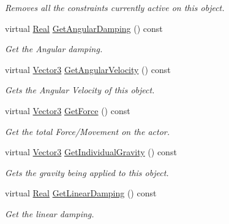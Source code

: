 \begin{DoxyCompactItemize}
\begin{DoxyCompactList}\small\item\em Removes all the constraints currently active on this object. \item\end{DoxyCompactList}\item 
virtual \hyperlink{namespaceMezzanine_a726731b1a7df72bf3583e4a97282c6f6}{Real} \hyperlink{classMezzanine_1_1ActorRigidPhysicsSettings_afadd3d7e1cee938622fc3781543489eb}{GetAngularDamping} () const 
\begin{DoxyCompactList}\small\item\em Get the Angular damping. \item\end{DoxyCompactList}\item 
virtual \hyperlink{classMezzanine_1_1Vector3}{Vector3} \hyperlink{classMezzanine_1_1ActorRigidPhysicsSettings_a5b078e767c73636afbabc0434f7af8c7}{GetAngularVelocity} () const 
\begin{DoxyCompactList}\small\item\em Gets the Angular Velocity of this object. \item\end{DoxyCompactList}\item 
virtual \hyperlink{classMezzanine_1_1Vector3}{Vector3} \hyperlink{classMezzanine_1_1ActorRigidPhysicsSettings_af5b4641d041c0dcbba8ef0a28566ca87}{GetForce} () const 
\begin{DoxyCompactList}\small\item\em Get the total Force/Movement on the actor. \item\end{DoxyCompactList}\item 
virtual \hyperlink{classMezzanine_1_1Vector3}{Vector3} \hyperlink{classMezzanine_1_1ActorRigidPhysicsSettings_aec9ec4d94326545b60056043c65bdb49}{GetIndividualGravity} () const 
\begin{DoxyCompactList}\small\item\em Gets the gravity being applied to this object. \item\end{DoxyCompactList}\item 
virtual \hyperlink{namespaceMezzanine_a726731b1a7df72bf3583e4a97282c6f6}{Real} \hyperlink{classMezzanine_1_1ActorRigidPhysicsSettings_ac5cb8f2aa589e7c76d39fee38e8fb5e2}{GetLinearDamping} () const 
\begin{DoxyCompactList}\small\item\em Get the linear damping. \item\end{DoxyCompactList}\item 

\end{DoxyCompactItemize}
